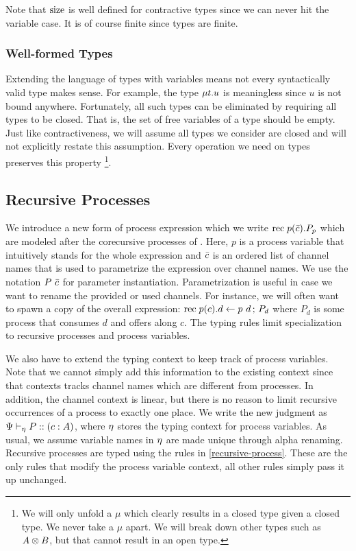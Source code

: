 Note that $\operatorname{size}$ is well defined for contractive types since we can never hit the variable case. It is of course finite since types are finite.


\subsubsection{Well-formed Types}

Extending the language of types with variables means not every syntactically valid type makes sense. For example, the type $\mu{t} . {u}$ is meaningless since $u$ is not bound anywhere. Fortunately, all such types can be eliminated by requiring all types to be closed. That is, the set of free variables of a type should be empty. Just like contractiveness, we will assume all types we consider are closed and will not explicitly restate this assumption. Every operation we need on types preserves this property%
\footnote{We will only unfold a $\mu$ which clearly results in a closed type given a closed type. We never take a $\mu$ apart. We will break down other types such as $A \otimes B$, but that cannot result in an open type.}.


\subsection{Recursive Processes}

We introduce a new form of process expression which we write $\mathrm{rec}\; {p}(\bar{c}) . {P}_p$ which are modeled after the corecursive processes of \cite{ToninhoCP14}. Here, $p$ is a process variable that intuitively stands for the whole expression and $\bar{c}$ is an ordered list of channel names that is used to parametrize the expression over channel names. We use the notation ${P}~{\bar{c}}$ for parameter instantiation. Parametrization is useful in case we want to rename the provided or used channels. For instance, we will often want to spawn a copy of the overall expression: $\mathrm{rec}\; {p}(c) . {d \leftarrow {p}~{d} \,;\, P_d}$ where $P_d$ is some process that consumes $d$ and offers along $c$. The typing rules limit specialization to recursive processes and process variables.

We also have to extend the typing context to keep track of process variables. Note that we cannot simply add this information to the existing context since that contexts tracks channel names which are different from processes. In addition, the channel context is linear, but there is no reason to limit recursive occurrences of a process to exactly one place. We write the new judgment as ${\Psi} \vdash_{\eta} P :: (c : A)$, where $\eta$ stores the typing context for process variables. As usual, we assume variable names in $\eta$ are made unique through alpha renaming. Recursive processes are typed using the rules in \cref{recursive-process}. These are the only rules that modify the process variable context, all other rules simply pass it up unchanged.

